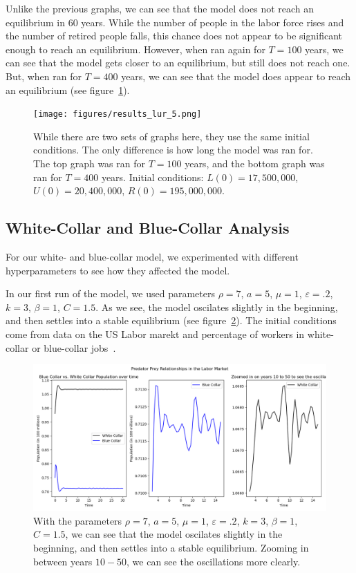 \documentclass[11pt]{amsart}
\begin{document}
Unlike the previous graphs, we can see that the model does not reach an equilibrium in 60 years. 
While the number of people in the labor force rises and the number of retired people falls, 
this chance does not appear to be significant enough to reach an equilibrium. However,
when ran again for $T = 100$ years, we can see that the model gets closer to an equilibrium, but 
still does not reach one. But, when ran for $T = 400$ years, we can see that the model 
does appear to reach an equilibrium (see figure~\ref{fig:results_lur_5}).

\begin{figure}[h]
    \centering
    \texttt{[image: figures/results\_lur\_5.png]}
    \caption{While there are two sets of graphs here, they use the same initial conditions.
            The only difference is how long the model was ran for. The top graph was ran for $T = 100$ years, and 
            the bottom graph was ran for $T = 400$ years.
            Initial conditions: $L(0) = 17,500,000$, $U(0) = 20,400,000$, $R(0) = 195,000,000$.}
    \label{fig:results_lur_5}
\end{figure}


\subsection{White-Collar and Blue-Collar Analysis}

For our white- and blue-collar model, we experimented with different hyperparameters to see how they affected the model. 

In our first run of the model, we used parameters $\rho = 7$, $a = 5$, $\mu = 1$, $\varepsilon = .2$, $k = 3$, $\beta = 1$, $C = 1.5$. As we see, the model oscilates
slightly in the beginning, and then settles into a stable equilibrium (see figure~\ref{fig:results_wb_1}). The initial conditions come from data on the US Labor marekt and percentage of workers in white-collar or blue-collar jobs~\cite{BLS}.

\begin{figure}[h]
    \centering
    \includegraphics[width=.8\textwidth]{figures/blue_vs_white2.png}
    \caption{With the parameters $\rho = 7$, $a = 5$, $\mu = 1$, $\varepsilon = .2$, $k = 3$, $\beta = 1$, $C = 1.5$, we can see that the model oscilates
    slightly in the beginning, and then settles into a stable equilibrium. Zooming in between years $10-50$, we can see the oscillations more clearly.}
    \label{fig:results_wb_1}
\end{figure}
\end{document}
